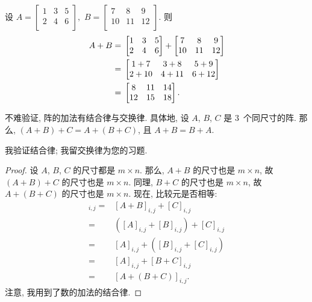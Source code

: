 \documentclass[../libro.tex]{subfiles}
\begin{document}
\begin{example}
    设
    \(
        A =
        \begin{bmatrix}
            1 & 3 & 5 \\
            2 & 4 & 6 \\
        \end{bmatrix},
    \)
    \(
        B =
        \begin{bmatrix}
            7  & 8  & 9  \\
            10 & 11 & 12 \\
        \end{bmatrix}.
    \)
    则
    \begin{align*}
        A + B
        = {} &
        \begin{bmatrix}
            1 & 3 & 5 \\
            2 & 4 & 6 \\
        \end{bmatrix}
        +
        \begin{bmatrix}
            7  & 8  & 9  \\
            10 & 11 & 12 \\
        \end{bmatrix}
        \\
        = {} &
        \begin{bmatrix}
            1 + 7  & 3 + 8  & 5 + 9  \\
            2 + 10 & 4 + 11 & 6 + 12 \\
        \end{bmatrix}
        \\
        = {} &
        \begin{bmatrix}
            8  & 11 & 14 \\
            12 & 15 & 18 \\
        \end{bmatrix}.
        \qedhere
    \end{align*}
\end{example}

不难验证, 阵的加法有结合律与交换律.
具体地, 设 \(A\), \(B\), \(C\) 是 \(3\)~个同尺寸的阵.
那么,
\((A + B) + C = A + (B + C)\),
且
\(A + B = B + A\).

我验证结合律;
我留交换律为您的习题.

\begin{proof}
    设 \(A\), \(B\), \(C\) 的尺寸都是 \(m \times n\).
    那么, \(A + B\) 的尺寸也是 \(m \times n\),
    故 \((A + B) + C\) 的尺寸也是 \(m \times n\).
    同理, \(B + C\) 的尺寸也是 \(m \times n\),
    故 \(A + (B + C)\) 的尺寸也是 \(m \times n\).
    现在, 比较元是否相等:
    \begin{align*}
        [(A + B) + C]_{i,j}
        = {} & [A + B]_{i,j} + [C]_{i,j}           \\
        = {} & ([A]_{i,j} + [B]_{i,j}) + [C]_{i,j} \\
        = {} & [A]_{i,j} + ([B]_{i,j} + [C]_{i,j}) \\
        = {} & [A]_{i,j} + [B + C]_{i,j}           \\
        = {} & [A + (B + C)]_{i,j}.
    \end{align*}
    注意, 我用到了数的加法的结合律.
\end{proof}
\end{document}
